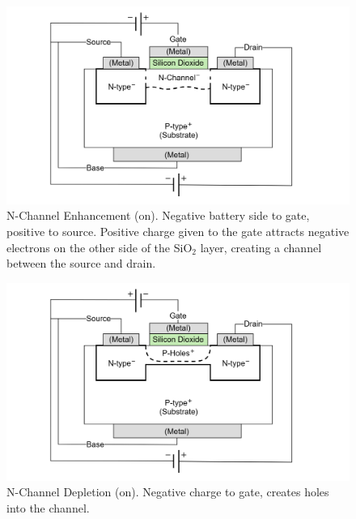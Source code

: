 \begin{figure}[ht!]
  \centering
  \includegraphics[width=.91\textwidth]{Sections/circuits/mosfet-on.png}
  \caption{N-Channel Enhancement (on). Negative battery side to gate, positive to source.
  Positive charge given to the gate attracts negative electrons on the other side of the 
  SiO$_2$ layer, creating a channel between the source and drain.}
  \label{fig:mosfet-on}
\end{figure}




\newpage 

\begin{figure}[ht!]
  \centering
  \includegraphics[width=.91\textwidth]{Sections/circuits/mosfet-depletion.png}
  \caption{N-Channel Depletion (on). Negative charge to gate, creates holes into the channel.}
  \label{fig:mosfet-depletion}
\end{figure}

